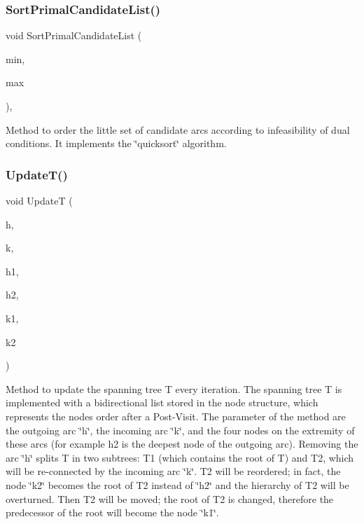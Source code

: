 \subsubsection{\texorpdfstring{Sort\+Primal\+Candidate\+List()}{SortPrimalCandidateList()}}
{\footnotesize\ttfamily void Sort\+Primal\+Candidate\+List (\begin{DoxyParamCaption}\item[{\mbox{\hyperlink{class_m_c_f_class_ad53d6229d7ec28555a9c9c2fd9abf773}{Index}}}]{min,  }\item[{\mbox{\hyperlink{class_m_c_f_class_ad53d6229d7ec28555a9c9c2fd9abf773}{Index}}}]{max }\end{DoxyParamCaption})\hspace{0.3cm}{\ttfamily [inline]}, {\ttfamily [private]}}

Method to order the little set of candidate arcs according to infeasibility of dual conditions. It implements the \char`\"{}quicksort\char`\"{} algorithm. \mbox{\label{class_m_c_f_simplex_aa9439b5dfb2ab2be94e1f131ad466ec3}} 
\subsubsection{\texorpdfstring{Update\+T()}{UpdateT()}}
{\footnotesize\ttfamily void UpdateT (\begin{DoxyParamCaption}\item[{A $\ast$}]{h,  }\item[{A $\ast$}]{k,  }\item[{N $\ast$}]{h1,  }\item[{N $\ast$}]{h2,  }\item[{N $\ast$}]{k1,  }\item[{N $\ast$}]{k2 }\end{DoxyParamCaption})\hspace{0.3cm}{\ttfamily [private]}}

Method to update the spanning tree T every iteration. The spanning tree T is implemented with a bidirectional list stored in the node structure, which represents the nodes\textquotesingle{} order after a Post-\/\+Visit. The parameter of the method are the outgoing arc \char`\"{}h\char`\"{}, the incoming arc \char`\"{}k\char`\"{}, and the four nodes on the extremity of these arcs (for example h2 is the deepest node of the outgoing arc). Removing the arc \char`\"{}h\char`\"{} splits T in two subtrees\+: T1 (which contains the root of T) and T2, which will be re-\/connected by the incoming arc \char`\"{}k\char`\"{}. T2 will be reordered; in fact, the node \char`\"{}k2\char`\"{} becomes the root of T2 instead of \char`\"{}h2\char`\"{} and the hierarchy of T2 will be overturned. Then T2 will be moved; the root of T2 is changed, therefore the predecessor of the root will become the node \char`\"{}k1\char`\"{}.

